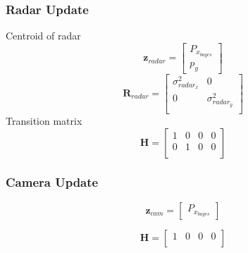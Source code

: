 \subsubsection{Radar Update}\label{sec:2-radar_update}  
Centroid of radar
\begin{equation}
    \mathbf{z}_{radar}=
    \begin{bmatrix}
        P_{x_{bayes}} \\ 
        p_y
    \end{bmatrix}
\end{equation}
\begin{equation}\label{equ:2_radar_R_kf}
    \mathbf{R}_{radar} = 
    \begin{bmatrix}
        \sigma_{radar_x}^2 & 0 \\
        0 & \sigma_{radar_y}^2 \\
      \end{bmatrix}
\end{equation}
Transition matrix
\begin{equation}\label{equ:2_radar_transition_matrix}
    \mathbf{H} = 
    \begin{bmatrix}
        1 & 0 & 0 & 0 \\
        0 & 1 & 0 & 0 \\
      \end{bmatrix}
\end{equation}



\subsubsection{Camera Update}\label{sec:2-camera_update}
\begin{equation}\label{equ:2_z_cam}
    \mathbf{z}_{cam}=
    \begin{bmatrix}P_{x_{bayes}}\end{bmatrix}
\end{equation}

\begin{equation}\label{equ:2_cam_transition_matrix}
    \mathbf{H} = 
    \begin{bmatrix}
        1 & 0 & 0 & 0 \\
      \end{bmatrix}
\end{equation}

